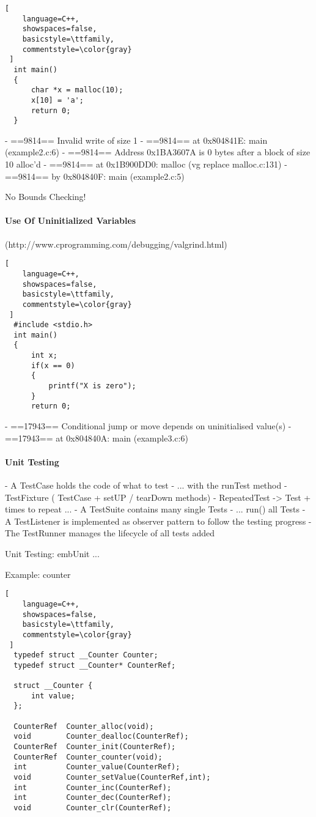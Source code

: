 \documentclass[a4paper]{article}
\begin{document}
\begin{multicols}{3}
\begin{lstlisting}[
    language=C++,
    showspaces=false,
    basicstyle=\ttfamily,
    commentstyle=\color{gray}
 ]
  int main()
  {
      char *x = malloc(10);
      x[10] = 'a';
      return 0;
  }
  \end{lstlisting}
  - ==9814== Invalid write of size 1
  - ==9814== at 0x804841E: main (example2.c:6)
  - ==9814== Address 0x1BA3607A is 0 bytes after a block of size 10 alloc'd
  - ==9814== at 0x1B900DD0: malloc (vg replace malloc.c:131)
  - ==9814== by 0x804840F: main (example2.c:5)
  
  No Bounds Checking!
  
  \paragraph{Use Of Uninitialized Variables}
  (http://www.cprogramming.com/debugging/valgrind.html)
  
  \begin{lstlisting}[
    language=C++,
    showspaces=false,
    basicstyle=\ttfamily,
    commentstyle=\color{gray}
 ]
  #include <stdio.h>
  int main()
  {
      int x;
      if(x == 0)
      {
          printf("X is zero");
      }
      return 0;
  \end{lstlisting}
  - ==17943== Conditional jump or move depends on uninitialised value(s)
  - ==17943== at 0x804840A: main (example3.c:6)
  
  \paragraph{Unit Testing}
  - A TestCase holds the code of what to test
    - ... with the runTest method
    - TestFixture ( TestCase + setUP / tearDown methods)
    - RepeatedTest -> Test + times to repeat ...
  - A TestSuite contains many single Tests
    - ... run() all Tests
  - A TestListener is implemented as observer pattern to follow the testing progress
  - The TestRunner manages the lifecycle of all tests added
  
  Unit Testing: embUnit ...
  
  Example: counter
  
  \begin{lstlisting}[
    language=C++,
    showspaces=false,
    basicstyle=\ttfamily,
    commentstyle=\color{gray}
 ]
  typedef struct __Counter Counter;
  typedef struct __Counter* CounterRef;
  
  struct __Counter {
      int value;
  };
  
  CounterRef  Counter_alloc(void);
  void        Counter_dealloc(CounterRef);
  CounterRef  Counter_init(CounterRef);
  CounterRef  Counter_counter(void);
  int         Counter_value(CounterRef);
  void        Counter_setValue(CounterRef,int);
  int         Counter_inc(CounterRef);
  int         Counter_dec(CounterRef);
  void        Counter_clr(CounterRef);
  

\end{lstlisting}
\end{multicols}
\end{document}
